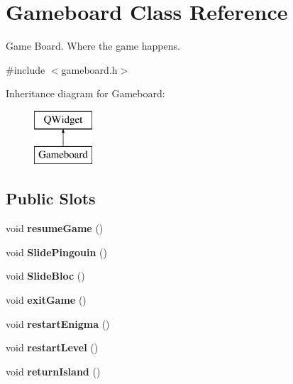 \hypertarget{class_gameboard}{}\section{Gameboard Class Reference}
\label{class_gameboard}


Game Board. Where the game happens.  




{\ttfamily \#include $<$gameboard.\+h$>$}

Inheritance diagram for Gameboard\+:\begin{figure}[H]
\begin{center}
\leavevmode
\includegraphics[height=2.000000cm]{class_gameboard}
\end{center}
\end{figure}
\subsection*{Public Slots}
\begin{DoxyCompactItemize}
\item 
\hypertarget{class_gameboard_a1447e62dd9f78bcba4bdb06c4bfb8f10}{}void {\bfseries resume\+Game} ()\label{class_gameboard_a1447e62dd9f78bcba4bdb06c4bfb8f10}

\item 
\hypertarget{class_gameboard_ac59525fc331dafd4a1a290593327aa7c}{}void {\bfseries Slide\+Pingouin} ()\label{class_gameboard_ac59525fc331dafd4a1a290593327aa7c}

\item 
\hypertarget{class_gameboard_aa4e9c04466f50e1590269eab05773581}{}void {\bfseries Slide\+Bloc} ()\label{class_gameboard_aa4e9c04466f50e1590269eab05773581}

\item 
\hypertarget{class_gameboard_af76ebc877764feed7bc9d90452178f5f}{}void {\bfseries exit\+Game} ()\label{class_gameboard_af76ebc877764feed7bc9d90452178f5f}

\item 
\hypertarget{class_gameboard_a0de799440eb9030b55bf3f59fa350683}{}void {\bfseries restart\+Enigma} ()\label{class_gameboard_a0de799440eb9030b55bf3f59fa350683}

\item 
\hypertarget{class_gameboard_a0d4ac38611d2ed24732823656ba613e0}{}void {\bfseries restart\+Level} ()\label{class_gameboard_a0d4ac38611d2ed24732823656ba613e0}

\item 
\hypertarget{class_gameboard_a538d797eadaa51a15c999c14f984f76c}{}void {\bfseries return\+Island} ()\label{class_gameboard_a538d797eadaa51a15c999c14f984f76c}

\end{DoxyCompactItemize}
